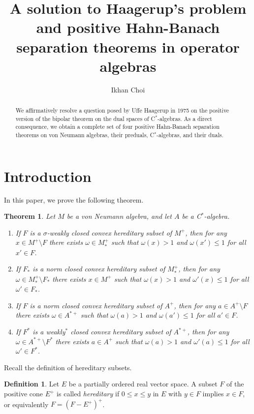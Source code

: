 \documentclass[11pt]{amsart}
\title[Positive Hahn-Banach separation theorems]{A solution to Haagerup's problem and positive Hahn-Banach separation theorems in operator algebras}
\author[I. Choi]{Ikhan Choi}
\theoremstyle{plain}
\newtheorem*{theorem*}{Theorem}
\theoremstyle{definition}
\newtheorem{definition}[theorem]{Definition}
\begin{document}
\begin{abstract}
We affirmatively resolve a question posed by Uffe Haagerup in 1975 on the positive version of the bipolar theorem on the dual spaces of C$^*$-algebras.
As a direct consequence, we obtain a complete set of four positive Hahn-Banach separation theorems on von Neumann algebras, their preduals, C$^*$-algebras, and their duals.
\end{abstract}

\maketitle


\section{Introduction}

In this paper, we prove the following theorem.

\begin{theorem*}
Let $M$ be a von Neumann algebra, and let $A$ be a C$^*$-algebra.
\begin{enumerate}[label=(\arabic*)]
\item If $F$ is a $\sigma$-weakly closed convex hereditary subset of $M^+$, then for any $x\in M^+\setminus F$ there exists $\omega\in M_*^+$ such that $\omega(x)>1$ and $\omega(x')\le1$ for all $x'\in F$.
\item If $F_*$ is a norm closed convex hereditary subset of $M_*^+$, then for any $\omega\in M_*^+\setminus F_*$ there exists $x\in M^+$ such that $\omega(x)>1$ and $\omega'(x)\le1$ for all $\omega'\in F_*$.
\item If $F$ is a norm closed convex hereditary subset of $A^+$, then for any $a\in A^+\setminus F$\qquad\qquad there exists $\omega\in A^{*+}$ such that $\omega(a)>1$ and $\omega(a')\le1$ for all $a'\in F$.
\item If $F^*$ is a weakly$^*$ closed convex hereditary subset of $A^{*+}$, then for any $\omega\in A^{*+}\setminus F^*$ there exists $a\in A^+$ such that $\omega(a)>1$ and $\omega'(a)\le1$ for all $\omega'\in F^*$.
\end{enumerate}
\end{theorem*}

Recall the definition of hereditary subsets.

\begin{definition}
Let $E$ be a partially ordered real vector space.
A subset $F$ of the positive cone $E^+$ is called \emph{hereditary} if $0\le x\le y$ in $E$ with $y\in F$ implies $x\in F$, or equivalently $F=(F-E^+)^+$.
\end{definition}
\end{document}
